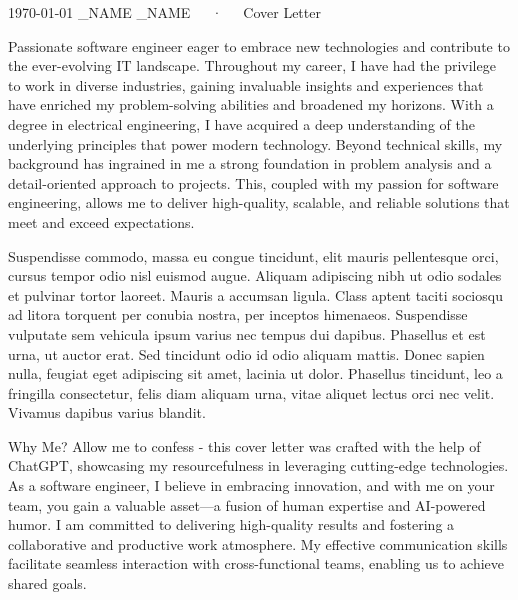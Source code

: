 \documentclass[11pt, a4paper]{awesome-cv}
\begin{document}
\makecvheader[R]

\makecvfooter
  {\today}
  {\FIRST_NAME \LAST_NAME~~~·~~~Cover Letter}
  {}

\makelettertitle

\begin{cvletter}

Passionate software engineer eager to embrace new technologies and contribute to the ever-evolving IT landscape. Throughout my career, I have had the privilege to work in diverse industries, gaining invaluable insights and experiences that have enriched my problem-solving abilities and broadened my horizons.
With a degree in electrical engineering, I have acquired a deep understanding of the underlying principles that power modern technology. Beyond technical skills, my background has ingrained in me a strong foundation in problem analysis and a detail-oriented approach to projects. This, coupled with my passion for software engineering, allows me to deliver high-quality, scalable, and reliable solutions that meet and exceed expectations.


Suspendisse commodo, massa eu congue tincidunt, elit mauris pellentesque orci, cursus tempor odio nisl euismod augue. Aliquam adipiscing nibh ut odio sodales et pulvinar tortor laoreet. Mauris a accumsan ligula. Class aptent taciti sociosqu ad litora torquent per conubia nostra, per inceptos himenaeos. Suspendisse vulputate sem vehicula ipsum varius nec tempus dui dapibus. Phasellus et est urna, ut auctor erat. Sed tincidunt odio id odio aliquam mattis. Donec sapien nulla, feugiat eget adipiscing sit amet, lacinia ut dolor. Phasellus tincidunt, leo a fringilla consectetur, felis diam aliquam urna, vitae aliquet lectus orci nec velit. Vivamus dapibus varius blandit.

Why Me? Allow me to confess - this cover letter was crafted with the help of ChatGPT, showcasing my resourcefulness in leveraging cutting-edge technologies. As a software engineer, I believe in embracing innovation, and with me on your team, you gain a valuable asset—a fusion of human expertise and AI-powered humor. 
I am committed to delivering high-quality results and fostering a collaborative and productive work atmosphere. My effective communication skills facilitate seamless interaction with cross-functional teams, enabling us to achieve shared goals.

\end{cvletter}


\makeletterclosing
\end{document}
